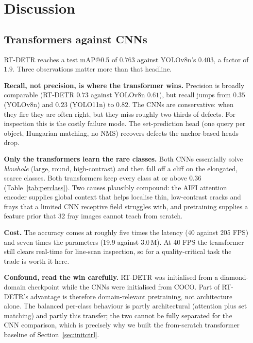 \documentclass[11pt,a4paper]{article}
\begin{document}
\section{Discussion}
\subsection{Transformers against CNNs}
RT-DETR reaches a test mAP@0.5 of $0.763$ against YOLOv8n's $0.403$, a factor of $1.9$. Three
observations matter more than that headline.

\textbf{Recall, not precision, is where the transformer wins.} Precision is broadly comparable
(RT-DETR $0.73$ against YOLOv8n $0.61$), but recall jumps from $0.35$ (YOLOv8n) and $0.23$
(YOLO11n) to $0.82$. The CNNs are conservative: when they fire they are often right, but they miss
roughly two thirds of defects. For inspection this is the costly failure mode. The set-prediction
head (one query per object, Hungarian matching, no NMS) recovers defects the anchor-based heads
drop.

\textbf{Only the transformers learn the rare classes.} Both CNNs essentially solve \emph{blowhole}
(large, round, high-contrast) and then fall off a cliff on the elongated, scarce classes. Both
transformers keep every class at or above $0.36$ (Table~\ref{tab:perclass}). Two causes plausibly
compound: the AIFI attention encoder supplies global context that helps localise thin, low-contrast
cracks and frays that a limited CNN receptive field struggles with, and pretraining supplies a
feature prior that 32 fray images cannot teach from scratch.

\textbf{Cost.} The accuracy comes at roughly five times the latency (40 against 205 FPS) and seven
times the parameters (19.9 against 3.0\,M). At 40 FPS the transformer still clears real-time for
line-scan inspection, so for a quality-critical task the trade is worth it here.

\textbf{Confound, read the win carefully.} RT-DETR was initialised from a diamond-domain checkpoint
while the CNNs were initialised from COCO. Part of RT-DETR's advantage is therefore domain-relevant
pretraining, not architecture alone. The balanced per-class behaviour is partly architectural
(attention plus set matching) and partly this transfer; the two cannot be fully separated for the
CNN comparison, which is precisely why we built the from-scratch transformer baseline of
Section~\ref{sec:initctrl}.
\end{document}
